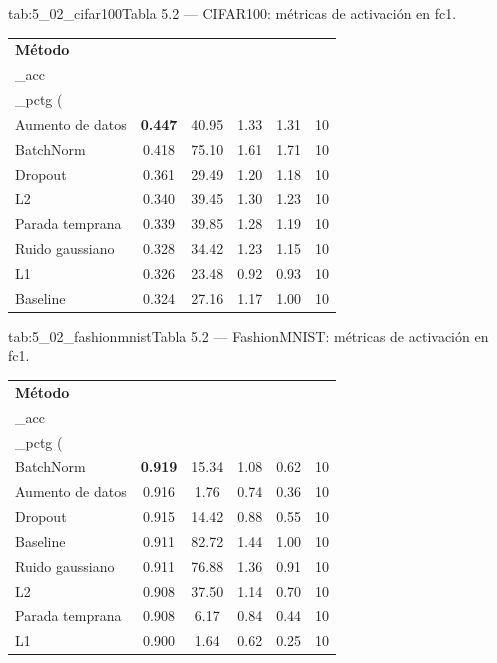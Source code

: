 \begin{table}{tab:5_02_cifar100}{Tabla 5.2 — CIFAR100: métricas de activación en fc1.}
\small
\begin{tabular}{lccccc}
\toprule
\textbf{Método} & \textbf{val\\_acc} & \textbf{uniq\\_pctg (\\%
\midrule
Aumento de datos & \textbf{0.447} & 40.95 & 1.33 & 1.31 & 10 \\
BatchNorm & 0.418 & 75.10 & 1.61 & 1.71 & 10 \\
Dropout & 0.361 & 29.49 & 1.20 & 1.18 & 10 \\
L2 & 0.340 & 39.45 & 1.30 & 1.23 & 10 \\
Parada temprana & 0.339 & 39.85 & 1.28 & 1.19 & 10 \\
Ruido gaussiano & 0.328 & 34.42 & 1.23 & 1.15 & 10 \\
L1 & 0.326 & 23.48 & 0.92 & 0.93 & 10 \\
Baseline & 0.324 & 27.16 & 1.17 & 1.00 & 10 \\
\bottomrule
\end{tabular}
\end{table}

\begin{table}{tab:5_02_fashionmnist}{Tabla 5.2 — FashionMNIST: métricas de activación en fc1.}
\small
\begin{tabular}{lccccc}
\toprule
\textbf{Método} & \textbf{val\\_acc} & \textbf{uniq\\_pctg (\\%
\midrule
BatchNorm & \textbf{0.919} & 15.34 & 1.08 & 0.62 & 10 \\
Aumento de datos & 0.916 & 1.76 & 0.74 & 0.36 & 10 \\
Dropout & 0.915 & 14.42 & 0.88 & 0.55 & 10 \\
Baseline & 0.911 & 82.72 & 1.44 & 1.00 & 10 \\
Ruido gaussiano & 0.911 & 76.88 & 1.36 & 0.91 & 10 \\
L2 & 0.908 & 37.50 & 1.14 & 0.70 & 10 \\
Parada temprana & 0.908 & 6.17 & 0.84 & 0.44 & 10 \\
L1 & 0.900 & 1.64 & 0.62 & 0.25 & 10 \\
\bottomrule
\end{tabular}
\end{table}